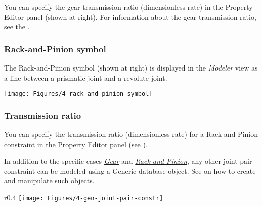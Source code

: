 You can specify the gear transmission ratio (dimensionless rate) in the
Property Editor panel (shown at right). For information about the gear
transmission ratio, see the .




\subsubsection{Rack-and-Pinion symbol}

\noindent
\begin{minipage}{0.6\textwidth}
  \raggedright
  The Rack-and-Pinion symbol (shown at right) is displayed in the
  {\sl Modeler} view as a line between a prismatic joint and a revolute
  joint.
\end{minipage}%
\begin{minipage}{0.4\textwidth}
  \raggedleft
  \texttt{[image: Figures/4-rack-and-pinion-symbol]}
\end{minipage}

\subsubsection{Transmission ratio}

\begin{minipage}{\textwidth}
You can specify the transmission ratio (dimensionless rate) for a
Rack-and-Pinion constraint in the Property Editor panel
(see ).
\end{minipage}

\clearpage
{}

In addition to the specific cases
\protect\hyperlink{gear}{\sl Gear} and
\protect\hyperlink{rack-and-pinion}{\sl Rack-and-Pinion},
any other joint pair constraint can be modeled using a Generic database object.
See 
on how to create and manipulate such objects.

\begin{wrapfigure}[8]{r}{0.4\textwidth}
  \vspace{-8mm}
  \texttt{[image: Figures/4-gen-joint-pair-constr]}
\end{wrapfigure}

